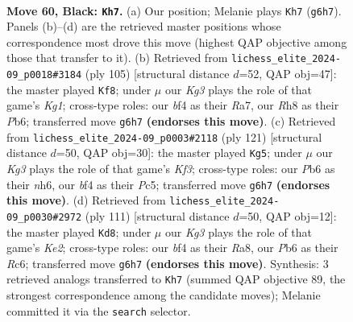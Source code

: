 \documentclass[11pt]{article}
\begin{document}
\clearpage

\begin{figure}[p]\centering
\begin{subfigure}{0.46\textwidth}\centering
\resizebox{\linewidth}{!}{%
\newchessgame
\chessboard[
  setfen={7r/pn6/1pr1p1k1/7p/2PKPB2/6P1/P1N2R2/1R6 b - - 3 60},
  showmover=false,
  pgfstyle=straightmove, color=movearrow, markmove={g6-h7}
]}
\caption{}
\end{subfigure}\hfill
\begin{subfigure}{0.46\textwidth}\centering
\resizebox{\linewidth}{!}{%
\newchessgame
\chessboard[
  setfen={4r1k1/r4p2/1p6/2p2B2/2P2P1Q/p3P3/7P/R6K b - - 0 53},
  showmover=false,
  pgfstyle=straightmove, color=movearrow, markmove={g8-f8}
]}
\caption{}
\end{subfigure}
\\[4pt]
\begin{subfigure}{0.46\textwidth}\centering
\resizebox{\linewidth}{!}{%
\newchessgame
\chessboard[
  setfen={8/8/1pr1pk1N/p1p4P/P1B5/1P2RK2/5P2/6r1 b - - 2 61},
  showmover=false,
  pgfstyle=straightmove, color=movearrow, markmove={f6-g5}
]}
\caption{}
\end{subfigure}\hfill
\begin{subfigure}{0.46\textwidth}\centering
\resizebox{\linewidth}{!}{%
\newchessgame
\chessboard[
  setfen={r7/4kp2/2r1pN1p/4P2P/pnP2P2/R4B2/4K3/8 b - - 3 56},
  showmover=false,
  pgfstyle=straightmove, color=movearrow, markmove={e7-d8}
]}
\caption{}
\end{subfigure}
\caption{\textbf{Move 60, Black: \texttt{Kh7}.} (a) Our position; Melanie plays \texttt{Kh7} (\texttt{g6h7}). Panels (b)--(d) are the retrieved master positions whose correspondence most drove this move (highest QAP objective among those that transfer to it). (b) Retrieved from \texttt{lichess\_elite\_2024-09\_p0018\#3184} (ply 105) [structural distance $d$=52, QAP obj=47]: the master played \texttt{Kf8}; under $\mu$ our \emph{Kg3} plays the role of that game's \emph{Kg1}; cross-type roles: our \emph{b}f4 as their \emph{R}a7, our \emph{R}h8 as their \emph{P}b6; transferred move \texttt{g6h7} \textbf{(endorses this move)}. (c) Retrieved from \texttt{lichess\_elite\_2024-09\_p0003\#2118} (ply 121) [structural distance $d$=50, QAP obj=30]: the master played \texttt{Kg5}; under $\mu$ our \emph{Kg3} plays the role of that game's \emph{Kf3}; cross-type roles: our \emph{P}b6 as their \emph{n}h6, our \emph{b}f4 as their \emph{P}c5; transferred move \texttt{g6h7} \textbf{(endorses this move)}. (d) Retrieved from \texttt{lichess\_elite\_2024-09\_p0030\#2972} (ply 111) [structural distance $d$=50, QAP obj=12]: the master played \texttt{Kd8}; under $\mu$ our \emph{Kg3} plays the role of that game's \emph{Ke2}; cross-type roles: our \emph{b}f4 as their \emph{R}a8, our \emph{P}b6 as their \emph{R}c6; transferred move \texttt{g6h7} \textbf{(endorses this move)}. Synthesis: 3 retrieved analogs transferred to \texttt{Kh7} (summed QAP objective 89, the strongest correspondence among the candidate moves); Melanie committed it via the \texttt{search} selector.}
\label{fig:thought-m119}
\end{figure}
\end{document}
